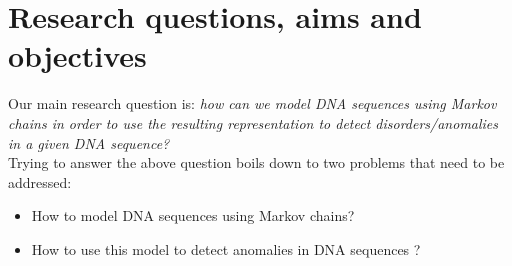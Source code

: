 \documentclass[10pt,twocolumn,letterpaper]{article}
\begin{document}
\section{Research questions, aims and objectives}
 {
    Our main research question is: \textit{how can we model DNA sequences using Markov chains in order 
    to use the resulting representation to detect disorders/anomalies in a given DNA sequence?}\\
    Trying to answer the above question boils down to two problems that need to be addressed:
    \begin{itemize}
        \item How to model DNA sequences using Markov chains?
        \item How to use this model to detect anomalies in DNA sequences \cite{scientific_american}?
    \end{itemize}

 }
\end{document}
